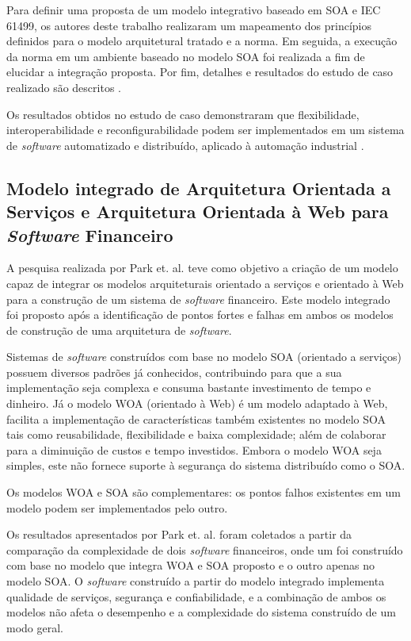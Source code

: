 Para definir uma proposta de um modelo integrativo baseado em SOA e IEC 61499, os autores deste trabalho realizaram um mapeamento dos princípios definidos para o modelo arquitetural tratado e a norma. Em seguida, a execução da norma em um ambiente baseado no modelo SOA foi realizada a fim de elucidar a integração proposta. Por fim, detalhes e resultados do estudo de caso realizado são descritos \cite{dai_bridging_2015}.

Os resultados obtidos no estudo de caso demonstraram que flexibilidade, interoperabilidade e reconfigurabilidade podem ser implementados em um sistema de \textit{software} automatizado e distribuído, aplicado à automação industrial \cite{dai_bridging_2015}.


\subsection{Modelo integrado de Arquitetura Orientada a Serviços e Arquitetura Orientada à Web para \textit{Software} Financeiro}
A pesquisa realizada por Park et. al. \cite{park_integrated_2012} teve como objetivo a criação de um modelo capaz de integrar os modelos arquiteturais orientado a serviços e orientado à Web para a construção de um sistema de \textit{software} financeiro. Este modelo integrado foi proposto após a identificação de pontos fortes e falhas em ambos os modelos de construção de uma arquitetura de \textit{software}.

Sistemas de \textit{software} construídos com base no modelo SOA (orientado a serviços) possuem diversos padrões já conhecidos, contribuindo para que a sua implementação seja complexa e consuma bastante investimento de tempo e dinheiro. Já o modelo WOA (orientado à Web) é um modelo adaptado à Web, facilita a implementação de características também existentes no modelo SOA tais como reusabilidade, flexibilidade e baixa complexidade; além de colaborar para a diminuição de custos e tempo investidos. Embora o modelo WOA seja simples, este não fornece suporte à segurança do sistema distribuído como o SOA.

Os modelos WOA e SOA são complementares: os pontos falhos existentes em um modelo podem ser implementados pelo outro.

Os resultados apresentados por Park et. al. \cite{park_integrated_2012} foram coletados a partir da comparação da complexidade de dois \textit{software} financeiros, onde um foi construído com base no modelo que integra WOA e SOA proposto e o outro apenas no modelo SOA. O \textit{software} construído a partir do modelo integrado implementa qualidade de serviços, segurança e confiabilidade, e a combinação de ambos os modelos não afeta o desempenho e a complexidade do sistema construído de um modo geral.

